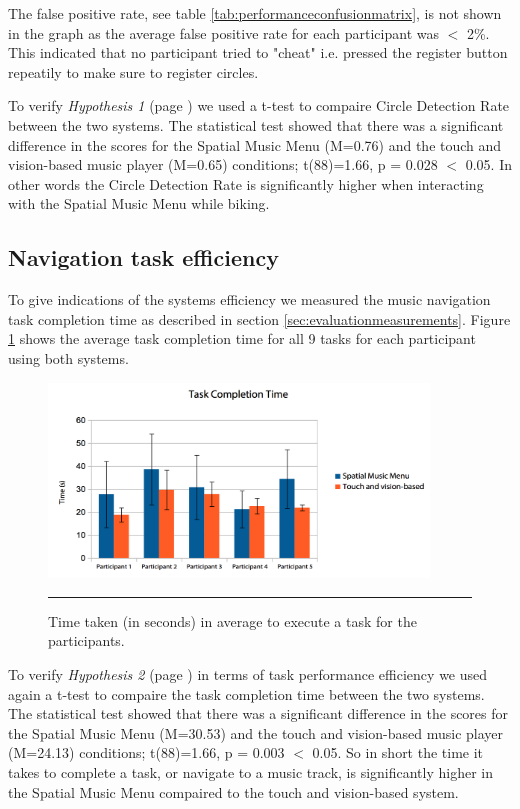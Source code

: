 The false positive rate, see table \ref{tab:performanceconfusionmatrix}, is not shown in the graph as the average false positive rate for each participant was $<$ 2\%. This indicated that no participant tried to "cheat" i.e. pressed the register button repeatily to make sure to register circles.

To verify \textit{Hypothesis 1} (page \pageref{sec:evaluationhypothesis}) we used a t-test to compaire Circle Detection Rate between the two systems. The statistical test showed that there was a significant difference in the scores for the Spatial Music Menu (M=0.76) and the touch and vision-based music player (M=0.65) conditions; t(88)=1.66, p = 0.028 $<$ 0.05. In other words the Circle Detection Rate is significantly higher when interacting with the Spatial Music Menu while biking.

\subsection{Navigation task efficiency}
To give indications of the systems efficiency we measured the music navigation task completion time as described in section \ref{sec:evaluationmeasurements}. Figure \ref{fig:resultstasktime} shows the average task completion time for all 9 tasks for each participant using both systems.

\begin{figure}[h]
	\centering
		\includegraphics[width=0.9\textwidth,height=\textheight,keepaspectratio]{./Figures/results_tasktime.png}
		\rule{35em}{1pt}
	\caption[Results task time]{Time taken (in seconds) in average to execute a task for the participants.}
	\label{fig:resultstasktime}
\end{figure}

To verify \textit{Hypothesis 2} (page \pageref{sec:evaluationhypothesis}) in terms of task performance efficiency we used again a t-test to compaire the task completion time between the two systems. The statistical test showed that there was a significant difference in the scores for the Spatial Music Menu (M=30.53) and the touch and vision-based music player (M=24.13) conditions; t(88)=1.66, p = 0.003 $<$ 0.05. So in short the time it takes to complete a task, or navigate to a music track, is significantly higher in the Spatial Music Menu compaired to the touch and vision-based system.

